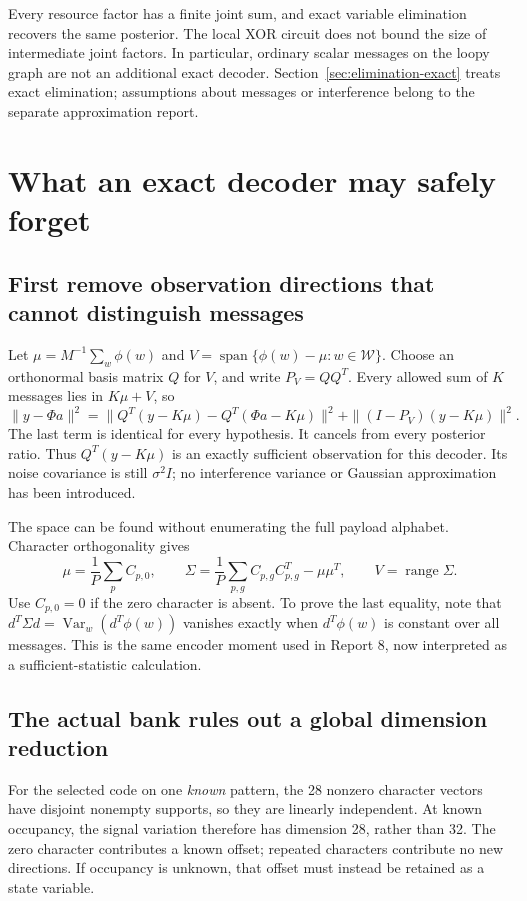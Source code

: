 \documentclass[10pt,a4paper]{article}
\newcommand{\calW}{\mathcal W}
\begin{document}
Every resource factor has a finite joint sum, and exact variable elimination recovers the same posterior.
The local XOR circuit does not bound the size of intermediate joint factors. In particular, ordinary scalar
messages on the loopy graph are not an additional exact decoder. Section~\ref{sec:elimination-exact} treats
exact elimination; assumptions about messages or interference belong to the separate approximation report.

\clearpage
\section{What an exact decoder may safely forget}
\label{sec:exact-reductions}
\subsection{First remove observation directions that cannot distinguish messages}
Let $\mu=M^{-1}\sum_w\phi(w)$ and
$V=\operatorname{span}\{\phi(w)-\mu:w\in\calW\}$. Choose an orthonormal basis matrix $Q$ for $V$, and write
$P_V=QQ^T$. Every allowed sum of $K$ messages lies in $K\mu+V$, so
\begin{equation}
 \|y-\Phi a\|^2
 =\|Q^T(y-K\mu)-Q^T(\Phi a-K\mu)\|^2
  +\|(I-P_V)(y-K\mu)\|^2.
 \label{eq:sufficient-observation}
\end{equation}
The last term is identical for every hypothesis. It cancels from every posterior ratio. Thus
$Q^T(y-K\mu)$ is an exactly sufficient observation for this decoder. Its noise covariance is still
$\sigma^2 I$; no interference variance or Gaussian approximation has been introduced.

The space can be found without enumerating the full payload alphabet. Character orthogonality gives
\begin{equation}
 \mu=\frac1P\sum_p C_{p,0},\qquad
 \Sigma=\frac1P\sum_{p,g}C_{p,g}C_{p,g}^T-\mu\mu^T,\qquad V=\operatorname{range}\Sigma.
 \label{eq:variation-moments}
\end{equation}
Use $C_{p,0}=0$ if the zero character is absent. To prove the last equality, note that
$d^T\Sigma d=\operatorname{Var}_w(d^T\phi(w))$ vanishes exactly when $d^T\phi(w)$ is constant over all messages.
This is the same encoder moment used in Report 8, now interpreted as a sufficient-statistic calculation.

\subsection{The actual bank rules out a global dimension reduction}
For the selected code on one \emph{known} pattern, the 28 nonzero character vectors have disjoint nonempty
supports, so they are linearly independent. At known occupancy, the signal variation therefore has dimension
28, rather than 32. The zero character contributes a known offset; repeated characters contribute no new
directions. If occupancy is unknown, that offset must instead be retained as a state variable.
\end{document}
